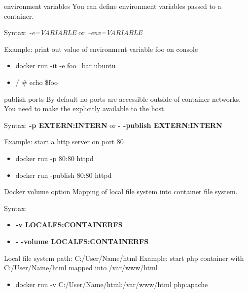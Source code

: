 \documentclass[10pt,aspectratio=\ratio,
compress
]{beamer}
\newcommand\meta{./meta}
\begin{document}
\begin{frame}{environment variables}
You can define environment variables passed to a container.

Syntax: \emph{-e=VARIABLE} or \emph{--env=VARIABLE}

Example: print out value of environment variable foo on console
\begin{itemize}
	\item docker run -it -e foo=bar ubuntu
	\item / \# echo \$foo
\end{itemize}
\end{frame}


\begin{frame}{publish ports}
By default no ports are accessible outside of container networks.
You need to make the explicitly available to the host.

\vspace{1cm}
Syntax: \textbf{-p EXTERN:INTERN} or \textbf{- -publish EXTERN:INTERN}

\vspace{1cm}
Example: start a http server on port 80
\begin{itemize}
	\item docker run -p 80:80 httpd
	\item docker run -publish 80:80 httpd
\end{itemize}

\end{frame}

\begin{frame}{Docker volume option}
Mapping of local file system into container file system.

Syntax: 
\begin{itemize}
	\item \textbf{-v LOCALFS:CONTAINERFS}
	\item \textbf{- -volume LOCALFS:CONTAINERFS}
\end{itemize}
Local file system path: C:/User/Name/html
Example: start php container with C:/User/Name/html mapped into /var/www/html
\begin{itemize}
	\item docker run -v C:/User/Name/html:/var/www/html php:apache
\end{itemize}
\end{frame}


\end{document}
